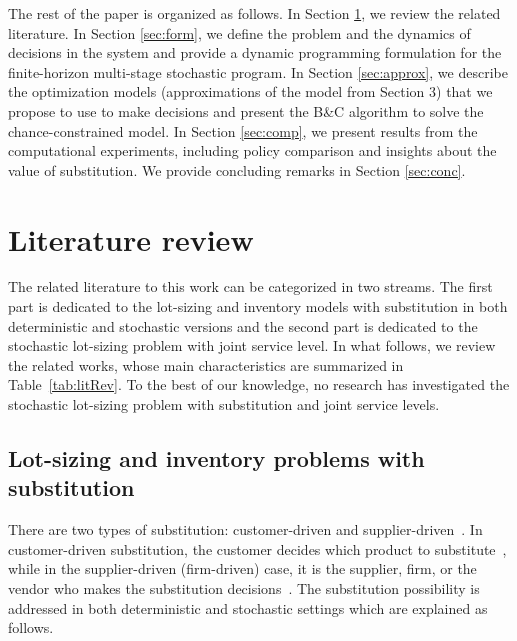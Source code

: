 \documentclass[msom]{oo}
\begin{document}
The rest of the paper is organized as follows. In Section \ref{sec:litrev}, we review the related literature. In Section \ref{sec:form}, we define the problem and the dynamics of decisions in the system and provide a dynamic programming formulation for the finite-horizon multi-stage stochastic program. In Section \ref{sec:approx}, we describe the optimization models (approximations of the model from Section 3) that we propose to use to make decisions and present the B\&C algorithm to solve the chance-constrained model.
In Section \ref{sec:comp}, we present results from the computational experiments, including policy comparison and insights about the value of substitution. We provide concluding remarks in Section \ref{sec:conc}.

\section{Literature review}
\label{sec:litrev}
The related literature to this work can be categorized in two streams. The first part is dedicated to the lot-sizing and inventory models with substitution in both deterministic and stochastic versions and the second part is dedicated to the stochastic lot-sizing problem with joint service level. In what follows, we review the related works, whose main characteristics are summarized in Table~\ref{tab:litRev}. To the best of our knowledge, no research has investigated the stochastic lot-sizing problem with substitution and joint service levels.




\subsection{Lot-sizing and inventory problems with substitution}
There are two types of substitution: customer-driven and supplier-driven~\citep{shin2015classification}. In customer-driven substitution, the customer decides which product to substitute~\citep{zeppetella2017optimal}, while in the supplier-driven (firm-driven) case, it is the supplier, firm, or the vendor who makes the substitution decisions~\citep{rao2004multi}. The substitution possibility is addressed in both deterministic and stochastic settings which are explained as follows.
\end{document}
